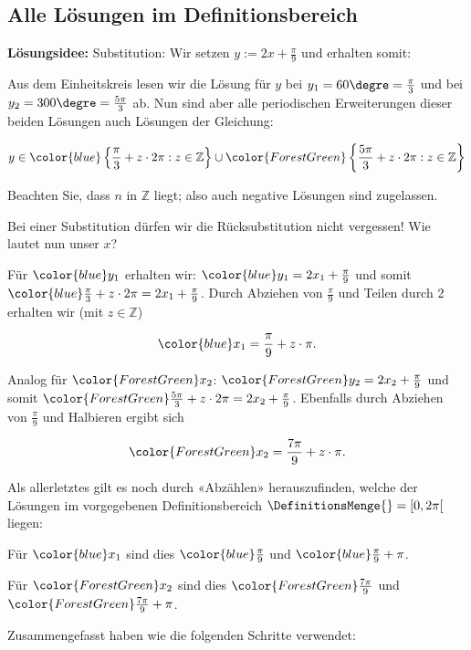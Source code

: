 \subsection{Alle Lösungen im Definitionsbereich}
\textbf{Lösungsidee:} Substitution:
Wir setzen $y := 2x + \frac{\pi}{9}$ und erhalten somit:



Aus dem Einheitskreis lesen wir die Lösung für $y$ bei $y_1=60\degre = \frac{\pi}{3}$ und bei $y_2=300\degre = \frac{5\pi}{3}$ ab. Nun sind aber alle periodischen Erweiterungen dieser beiden Lösungen auch Lösungen der Gleichung:

$$y \in {\color{blue}\left\{\frac{\pi}{3} + z\cdot{}2\pi: z\in\mathbb{Z}\right\}} \cup {\color{ForestGreen}\left\{\frac{5\pi}{3}+ z\cdot{}2\pi: z\in\mathbb{Z}\right\}}$$

Beachten Sie, dass $n$ in $\mathbb{Z}$ liegt; also auch negative Lösungen sind zugelassen.

Bei einer Substitution dürfen wir die Rücksubstitution nicht vergessen! Wie lautet nun unser $x$?

Für ${\color{blue}y_1}$ erhalten wir: ${\color{blue}y_1= 2x_1 + \frac{\pi}{9}}$ und somit ${\color{blue}\frac{\pi}{3} + z\cdot{}2\pi = 2x_1 + \frac{\pi}{9}}$. Durch Abziehen von $\frac{\pi}{9}$ und Teilen durch 2 erhalten wir (mit $z\in\mathbb{Z}$)

$${\color{blue}x_1 = \frac{\pi}{9} + z\cdot{}\pi}.$$

Analog für ${\color{ForestGreen}x_2}$: ${\color{ForestGreen}y_2 = 2x_2 + \frac{\pi}{9}}$ und somit ${\color{ForestGreen}\frac{5\pi}{3} + z\cdot{}2\pi = 2x_2 + \frac{\pi}{9}}$. Ebenfalls durch Abziehen von $\frac{\pi}{9}$ und Halbieren ergibt sich

$${\color{ForestGreen}x_2 = \frac{7\pi}{9} + z\cdot{}\pi.}$$

Als allerletztes gilt es noch durch «Abzählen» herauszufinden, welche der Lösungen im vorgegebenen Definitionsbereich $\DefinitionsMenge{} = [0, 2\pi[$ liegen:

    Für ${\color{blue}x_1}$ sind dies ${\color{blue}\frac{\pi}{9}}$ und ${\color{blue}\frac{\pi}{9} + \pi}$.

    Für ${\color{ForestGreen}x_2}$ sind dies ${\color{ForestGreen}\frac{7\pi}{9}}$ und ${\color{ForestGreen}\frac{7\pi}{9} + \pi}$.
   
    Zusammengefasst haben wie die folgenden Schritte verwendet:
\newpage


